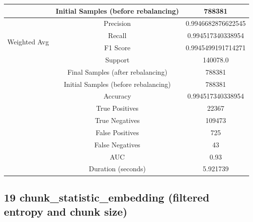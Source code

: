 \begin{longtable}{|c|c|c|}
 & Initial Samples (before rebalancing) & 788381 \\
\hline
\multirow{4}{*}{Weighted Avg} & Precision & 0.9946682876622545 \\
 & Recall & 0.994517340338954 \\
 & F1 Score & 0.9945499191714271 \\
 & Support & 140078.0 \\
 & Final Samples (after rebalancing) & 788381 \\
 & Initial Samples (before rebalancing) & 788381 \\
\hline
& Accuracy & 0.994517340338954 \\ \hline
& True Positives & 22367 \\ \hline
& True Negatives & 109473 \\ \hline
& False Positives & 725 \\ \hline
& False Negatives & 43 \\ \hline
& AUC & 0.93 \\ \hline
& Duration (seconds) & 5.921739 \\ \hline
\end{longtable}


\subsection{19 chunk\_statistic\_embedding (filtered entropy and chunk size)}

